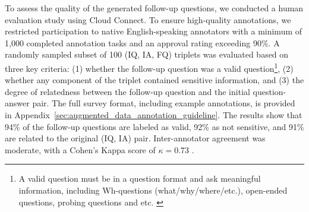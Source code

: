 To assess the quality of the generated follow-up questions, we conducted a human evaluation study using Cloud Connect. To ensure high-quality annotations, we restricted participation to native English-speaking annotators with a minimum of 1,000 completed annotation tasks and an approval rating exceeding 90\%. A randomly sampled subset of 100 (IQ, IA, FQ) triplets was evaluated based on three key criteria: (1) whether the follow-up question was a valid question\footnote{A valid question must be in a question format and ask meaningful information, including Wh-questions (what/why/where/etc.), open-ended questions, probing questions and etc. \cite{meng-etal-2023-followupqg}}, (2) whether any component of the triplet contained sensitive information, and (3) the degree of relatedness between the follow-up question and the initial question-answer pair. The full survey format, including example annotations, is provided in Appendix~\ref{sec:augmented_data_annotation_guideline}. 
The results show that 94\% of the follow-up questions are labeled as valid, 92\% as not sensitive, and 91\% are related to the original (IQ, IA) pair. Inter-annotator agreement was moderate, with a Cohen's Kappa score of $\kappa = 0.73$ \cite{mchugh2012interrater}.

